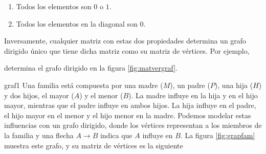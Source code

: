 \begin{enumerate}[label=\roman*)]
    \item Todos los elementos son $0$ o $1$.
    \item Todos los elementos en la diagonal son $0$.
\end{enumerate}
Inversamente, cualquier matriz con estas dos propiedades determina un grafo dirigido único que tiene dicha matriz como su matriz de vértices. Por ejemplo,
\begin{nscenter}
\end{nscenter}
determina el grafo dirigido en la figura \ref{fig:matvergraf}.

\begin{examplebox}{}{graf1}
    Una familia está compuesta por una madre ($M$), un padre ($P$), una hija ($H$) y dos hijos, el mayor ($A$) y el menor ($B$). La madre influye en la hija y en el hijo mayor, mientras que el padre influye en ambos hijos. La hija influye en el padre, el hijo mayor en el menor y el hijo menor en la madre. Podemos modelar estas influencias con un grafo dirigido, donde los vértices representan a los miembros de la familia y una flecha $A \rightarrow B$ indica que $A$ influye en $B$. La figura \ref{fig:grapfam} muestra este grafo, y su matriz de vértices es la siguiente
    \begin{matrizn}
    \end{matrizn}
\end{examplebox}

